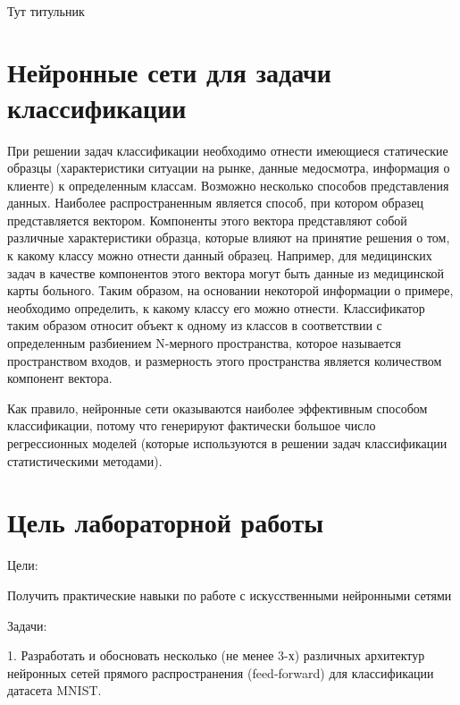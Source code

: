 \documentclass[a4paper,12pt]{article}
\begin{document}
\begin{titlepage}
\newpage

\

Тут титульник
\end{titlepage}

\newpage
\tableofcontents
\setcounter{page}{2}


\newpage\section{Нейронные сети для задачи классификации} 
	При решении задач классификации необходимо отнести имеющиеся статические образцы (характеристики ситуации на рынке, данные медосмотра, информация о клиенте) к определенным классам. Возможно несколько способов представления данных. Наиболее распространенным является способ, при котором образец представляется вектором. Компоненты этого вектора представляют собой различные характеристики образца, которые влияют на принятие решения о том, к какому классу можно отнести данный образец. Например, для медицинских задач в качестве компонентов этого вектора могут быть данные из медицинской карты больного. Таким образом, на основании некоторой информации о примере, необходимо определить, к какому классу его можно отнести. Классификатор таким образом относит объект к одному из классов в соответствии с определенным разбиением N-мерного пространства, которое называется пространством входов, и размерность этого пространства является количеством компонент вектора.
	
	\vspace{0.5cm}
	Как правило, нейронные сети оказываются наиболее эффективным способом классификации, потому что генерируют фактически большое число регрессионных моделей (которые используются в решении задач классификации статистическими методами).
	
	

	

\newpage\section{Цель лабораторной работы} 
	Цели: 
	\vspace{0.5cm}
	
	Получить практические навыки по работе с искусственными нейронными сетями
	
	\vspace{0.5cm}
	Задачи: 
	
	\vspace{0.5cm}
	1. Разработать и обосновать несколько (не менее 3-х) различных архитектур нейронных сетей прямого распространения (feed-forward) для классификации датасета MNIST.
	
\end{document}
